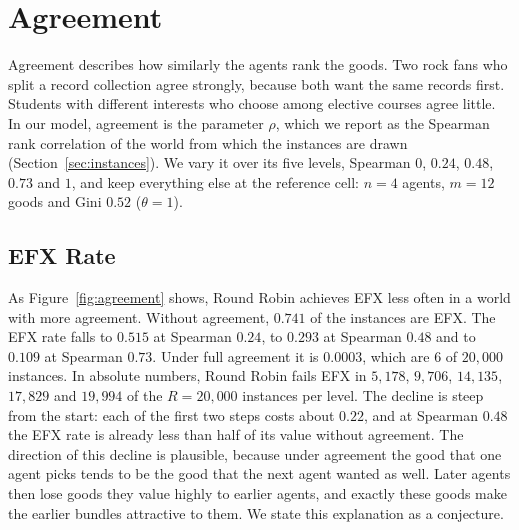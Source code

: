 \section{Agreement}\label{sec:agreement}

Agreement describes how similarly the agents rank the goods. Two rock fans who split a record collection agree strongly, because both want the same records first.
Students with different interests who choose among elective courses agree little. In our model, agreement
is the parameter $\rho$, which we report as the Spearman rank correlation of the world from which
the instances are drawn (Section~\ref{sec:instances}). We vary it over its five levels, Spearman
$0$, $0.24$, $0.48$, $0.73$ and $1$, and keep everything else at the reference cell: $n=4$
agents, $m=12$ goods and Gini $0.52$ ($\theta=1$).

\subsection{EFX Rate}\label{sec:agreement-rate}

As Figure~\ref{fig:agreement} shows, Round Robin achieves EFX less often in a world with more
agreement. Without agreement, $0.741$ of the instances are EFX. The EFX rate falls to $0.515$ at
Spearman $0.24$, to $0.293$ at Spearman $0.48$ and to $0.109$ at Spearman $0.73$. Under full
agreement it is $0.0003$, which are $6$ of $20{,}000$ instances. In absolute numbers, Round Robin
fails EFX in $5{,}178$, $9{,}706$, $14{,}135$, $17{,}829$ and $19{,}994$ of the $R=20{,}000$
instances per level. The decline is steep from the start: each of the first two steps costs about
$0.22$, and at Spearman $0.48$ the EFX rate is already less than half of its value without agreement. The direction of this
decline is plausible, because under agreement the good that one agent
picks tends to be the good that the next agent wanted as well. Later agents then lose goods they
value highly to earlier agents, and exactly these goods make the earlier bundles attractive to
them. We state this explanation as a conjecture.

